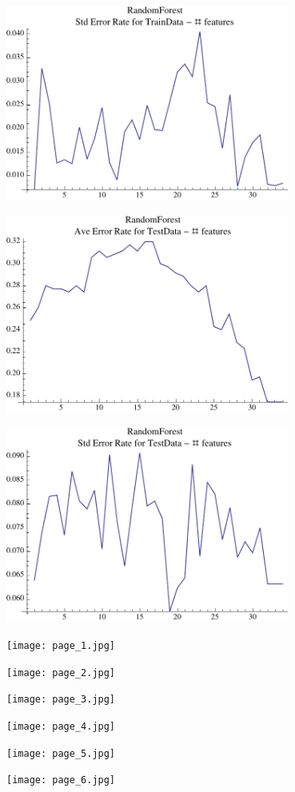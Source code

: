 \documentclass[12pt]{amsart}
\begin{document}
\begin{center}
\includegraphics[width=0.7\textwidth]{stdRFTrain.pdf}
\end{center}

\begin{center}
\includegraphics[width=0.7\textwidth]{aveErrorTest.pdf}
\end{center}

\begin{center}
\includegraphics[width=0.7\textwidth]{stdRFTest.pdf}
\end{center}

\begin{center}
\texttt{[image: page\_1.jpg]}
\end{center}

\begin{center}
\texttt{[image: page\_2.jpg]}
\end{center}

\begin{center}
\texttt{[image: page\_3.jpg]}
\end{center}

\begin{center}
\texttt{[image: page\_4.jpg]}
\end{center}

\begin{center}
\texttt{[image: page\_5.jpg]}
\end{center}

\begin{center}
\texttt{[image: page\_6.jpg]}
\end{center}
\end{document}
